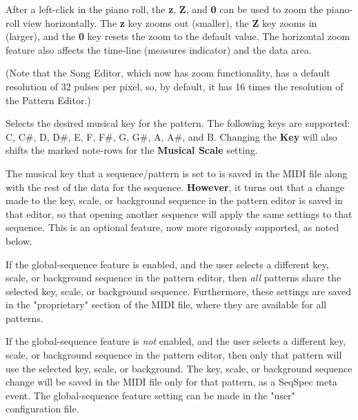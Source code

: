    After a left-click in the piano roll, the
   \textbf{z}, \textbf{Z}, and \textbf{0}
   can be used to zoom the piano-roll view horizontally.
   The \textbf{z} key zooms out (smaller),
   the \textbf{Z} key zooms in (larger),
   and the \textbf{0} key resets the zoom to the default value.
   The horizontal zoom feature also affects the time-line
   (measures indicator) and the data area.

   (Note that the Song Editor, which now has zoom functionality,
   has a default resolution of 32 pulses per pixel, so, by default, it has
   16 times the resolution of the Pattern Editor.)

   Selects the desired musical key for the pattern.  The following keys are
   supported:  C, C\#, D, D\#, E, F, F\#, G, G\#, A, A\#, and B.
   Changing the \textbf{Key} will also shifts the marked note-rows
   for the \textbf{Musical Scale} setting.

   The musical key that a sequence/pattern is set to is
   saved in the MIDI file along with the rest of the data for the sequence.
   \textbf{However},
   it turns out that a change made to the key, scale, or background sequence in
   the pattern editor is saved in that editor, so that opening another sequence
   will apply the same settings to that sequence.  This is an optional feature,
   now more rigorously supported, as noted below.

   If the global-sequence feature is enabled, and the user selects
   a different key, scale, or background sequence in the pattern editor, 
   then \textsl{all} patterns share the selected key, scale, or background
   sequence.  Furthermore, these settings are saved in the "proprietary"
   section of the MIDI file, where they are available for all patterns.

   If the global-sequence feature is \textsl{not} enabled, and the user selects
   a different key, scale, or background sequence in the pattern editor, 
   then only that pattern will use the selected key, scale, or background.
   The key, scale, or background sequence change will be saved in the MIDI file
   only for that pattern, as a SeqSpec meta event.
   The global-sequence feature setting can be made in the "user" configuration
   file.

